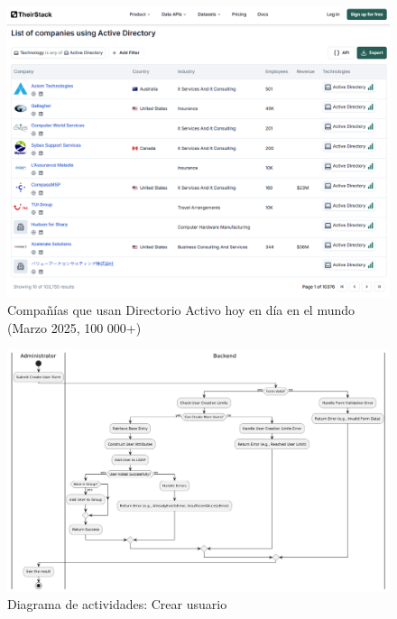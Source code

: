 \newpage
{}
\begin{landscape}
    \begin{figure}[H]
        \centering
        \includegraphics[width=\linewidth]{images/companies using ad - 3.png}
        \caption{Compañías que usan Directorio Activo hoy en día en el mundo (Marzo 2025, 100 000+)}
        \label{fig:companies-using-ad}
    \end{figure}

    \begin{figure}[H]
        \centering
        \includegraphics[scale=0.55]{images/puml/activity-diagram-create-user/activity-diagram create user.png}
        \caption{Diagrama de actividades: Crear usuario}
        \label{fig:activity-diagram-create-user}
    \end{figure}
\end{landscape}
\restoregeometry


